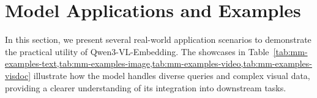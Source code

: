 \section{Model Applications and Examples}

In this section, we present several real-world application scenarios to demonstrate the practical utility of Qwen3-VL-Embedding. The showcases in Table~\cref{tab:mm-examples-text,tab:mm-examples-image,tab:mm-examples-video,tab:mm-examples-visdoc} illustrate how the model handles diverse queries and complex visual data, providing a clearer understanding of its integration into downstream tasks.




